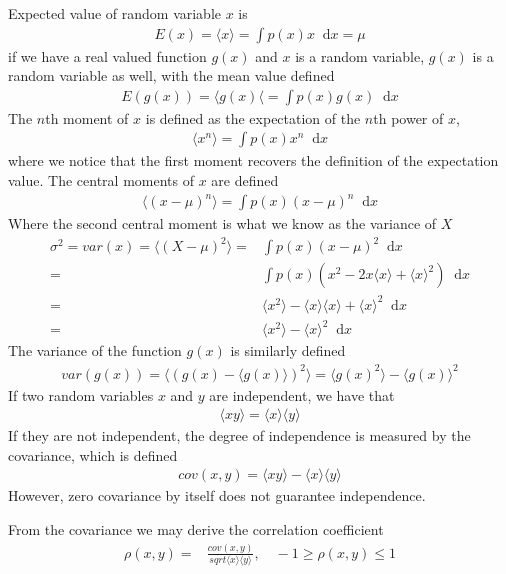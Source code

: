 \documentclass[twoside,english]{uiofysmaster}
\newcommand*\dif{\mathop{}\!\mathrm{d}}
\begin{document}
Expected value of random variable $x$ is
\begin{align}
	E(x) = \langle x \rangle = \int p(x) x \dif x = \mu
\end{align}
if we have a real valued function $g(x)$ and $x$ is a random variable, $g(x)$ is a random variable as well, with the mean value defined
\begin{align}
	E(g(x)) = \langle g(x) \langle = \int p(x) g(x) \dif x
\end{align}
The $n$th moment of $x$ is defined as the expectation of the $n$th power of $x$,
\begin{align}
	\langle x^n \rangle = \int p(x) x^n \dif x
\end{align}
where we notice that the first moment recovers the definition of the expectation value.
The central moments of $x$ are defined
\begin{align}
	\langle (x-\mu)^n \rangle = \int p(x) (x - \mu)^n \dif x
\end{align}
Where the second central moment is what we know as the variance of $X$
\begin{align}
	\sigma^2 = var(x) = \langle (X-\mu)^2 \rangle =& \int p(x) (x - \mu)^2 \dif x  \\
	=& \int p(x) (x^2 - 2x \langle x \rangle + \langle x \rangle^2) \dif x \\
	=& \langle x^2 \rangle - \langle x \rangle \langle x \rangle + \langle x \rangle^2 \dif x \\
	=& \langle x^2 \rangle - \langle x \rangle^2 \dif x 
\end{align}
The variance of the function $g(x)$ is similarly defined
\begin{align}
	var(g(x)) = \langle (g(x) - \langle g(x) \rangle)^2 \rangle 
	= \langle g(x)^2 \rangle - \langle g(x) \rangle^2
\end{align}
If two random variables $x$ and $y$ are independent, we have that
\begin{align}
	\langle xy \rangle = \langle x \rangle \langle y \rangle
\end{align}
If they are not independent, the degree of independence is measured by the covariance, which is defined
\begin{align}
	cov(x,y) = \langle xy \rangle - \langle x \rangle \langle y \rangle
\end{align}
However, zero covariance by itself does not guarantee independence.

From the covariance we may derive the correlation coefficient
\begin{align}
	\rho(x,y) =& \frac{cov(x,y)}{sqrt{ \langle x \rangle \langle y \rangle }}, \quad
	-1 \geq \rho(x,y) \leq 1
\end{align}
\end{document}

